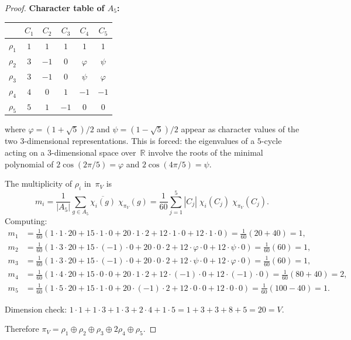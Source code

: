 \documentclass[11pt,a4paper]{article}
\theoremstyle{plain}
\theoremstyle{definition}
\newcommand{\vp}{\varphi}
\newcommand{\ps}{\psi}
\newcommand{\R}{\mathbb{R}}
\begin{document}
\begin{proof}
\smallskip\noindent
\textbf{Character table of $A_5$:}
\begin{center}
\begin{tabular}{@{}c|ccccc@{}}
 & $C_1$ & $C_2$ & $C_3$ & $C_4$ & $C_5$ \\
\midrule
$\rho_1$ & $1$ & $1$ & $1$ & $1$ & $1$ \\
$\rho_2$ & $3$ & $-1$ & $0$ & $\vp$ & $\ps$ \\
$\rho_3$ & $3$ & $-1$ & $0$ & $\ps$ & $\vp$ \\
$\rho_4$ & $4$ & $0$ & $1$ & $-1$ & $-1$ \\
$\rho_5$ & $5$ & $1$ & $-1$ & $0$ & $0$ \\
\end{tabular}
\end{center}
where $\vp = (1+\sqrt{5})/2$ and $\ps = (1-\sqrt{5})/2$ appear as
character values of the two $3$-dimensional representations.  This is
forced: the eigenvalues of a $5$-cycle acting on a $3$-dimensional
space over~$\R$ involve the roots of the minimal polynomial of
$2\cos(2\pi/5) = \vp$ and $2\cos(4\pi/5) = \ps$.

The multiplicity of $\rho_i$ in~$\pi_V$ is
\[
  m_i = \frac{1}{|A_5|}\sum_{g \in A_5}
        \overline{\chi_i(g)}\;\chi_{\pi_V}(g)
      = \frac{1}{60}\sum_{j=1}^{5} |C_j|\;\chi_i(C_j)\;\chi_{\pi_V}(C_j).
\]
Computing:
\begin{align*}
  m_1 &= \tfrac{1}{60}(1 \cdot 1 \cdot 20 + 15 \cdot 1 \cdot 0
    + 20 \cdot 1 \cdot 2 + 12 \cdot 1 \cdot 0 + 12 \cdot 1 \cdot 0)
  = \tfrac{1}{60}(20 + 40) = 1, \\[3pt]
  m_2 &= \tfrac{1}{60}(1 \cdot 3 \cdot 20 + 15 \cdot (-1) \cdot 0
    + 20 \cdot 0 \cdot 2 + 12 \cdot \vp \cdot 0 + 12 \cdot \ps \cdot 0)
  = \tfrac{1}{60}(60) = 1, \\[3pt]
  m_3 &= \tfrac{1}{60}(1 \cdot 3 \cdot 20 + 15 \cdot (-1) \cdot 0
    + 20 \cdot 0 \cdot 2 + 12 \cdot \ps \cdot 0 + 12 \cdot \vp \cdot 0)
  = \tfrac{1}{60}(60) = 1, \\[3pt]
  m_4 &= \tfrac{1}{60}(1 \cdot 4 \cdot 20 + 15 \cdot 0 \cdot 0
    + 20 \cdot 1 \cdot 2 + 12 \cdot (-1) \cdot 0 + 12 \cdot (-1) \cdot 0)
  = \tfrac{1}{60}(80 + 40) = 2, \\[3pt]
  m_5 &= \tfrac{1}{60}(1 \cdot 5 \cdot 20 + 15 \cdot 1 \cdot 0
    + 20 \cdot (-1) \cdot 2 + 12 \cdot 0 \cdot 0 + 12 \cdot 0 \cdot 0)
  = \tfrac{1}{60}(100 - 40) = 1.
\end{align*}

Dimension check: $1 \cdot 1 + 1 \cdot 3 + 1 \cdot 3 + 2 \cdot 4 + 1 \cdot 5
= 1 + 3 + 3 + 8 + 5 = 20 = V$.  \checkmark

Therefore $\pi_V = \rho_1 \oplus \rho_2 \oplus \rho_3
\oplus 2\rho_4 \oplus \rho_5$.
\end{proof}
\end{document}

